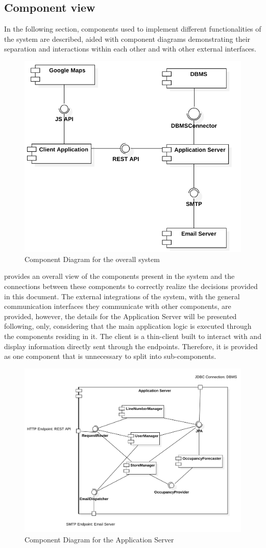 \subsection{Component view}
In the following section, components used to implement different functionalities of the system are described, aided with component diagrams demonstrating their separation and interactions within each other and with other external interfaces.
\begin{figure}[H]
    \centering
    \includegraphics[height=0.4\textwidth]{Images/ComponentDiagrams/Overall.png}
    \caption{Component Diagram for the overall system}
    \label{fig:CDOverall}
\end{figure}
 provides an overall view of the components present in the system and the connections between these components to correctly realize the decisions provided in this document.
The external integrations of the system, with the general communication interfaces they communicate with other components, are provided, however, the details for the Application Server will be presented following, only, considering that the main application logic is executed through the components residing in it.
The client is a thin-client built to interact with and display information directly sent through the endpoints.
Therefore, it is provided as one component that is unnecessary to split into sub-components.
\begin{figure}[H]
    \centering
    \includegraphics[height=0.4\textwidth]{Images/ComponentDiagrams/ApplicationServer.png}
    \caption{Component Diagram for the Application Server}
    \label{fig:CDApplicationServer}
\end{figure}
